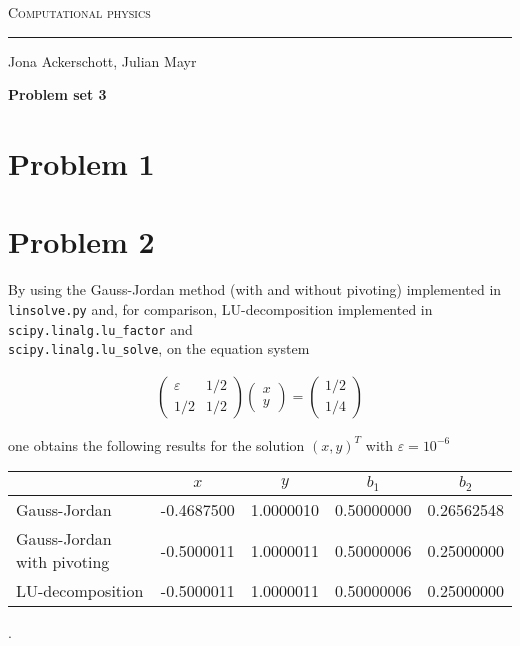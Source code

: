 \documentclass[12pt, a4paper]{article}
\begin{document}
  
  \centerline{\Huge\scshape Computational physics}
  \vspace*{0.5cm}
  \hrule
  \vspace*{0.5cm}
  \centerline{Jona Ackerschott, Julian Mayr}
  \vspace*{1cm}
  \centerline{\Large\bfseries Problem set 3}
  \vspace*{0.5cm}

  \section*{Problem 1}

  \section*{Problem 2}
  By using the Gauss-Jordan method (with and without pivoting) implemented in {\tt linsolve.py} and, for comparison, LU-decomposition implemented in {\tt scipy.linalg.lu\_factor} and\\ {\tt scipy.linalg.lu\_solve}, on the equation system

  \begin{align}
    \begin{pmatrix} \varepsilon & 1/2 \\ 1/2 & 1/2 \end{pmatrix}
    \begin{pmatrix} x \\ y \end{pmatrix} = 
    \begin{pmatrix} 1/2 \\ 1/4 \end{pmatrix}
    \label{p1_eqsys}
  \end{align}

  \noindent
  one obtains the following results for the solution $(x, y)^T$ with $\varepsilon = 10^{-6}$

  \begin{center}
    \begin{tabular}{l | c | c | c | c}
                                 & $x$        & $y$       & $b_1$       & $b_2$      \\
      \hline
      Gauss-Jordan               & -0.4687500 & 1.0000010 & 0.50000000  & 0.26562548 \\
      \hline
      Gauss-Jordan with pivoting & -0.5000011 & 1.0000011 & 0.50000006  & 0.25000000 \\
      \hline
      LU-decomposition           & -0.5000011 & 1.0000011 & 0.50000006  & 0.25000000
    \end{tabular}
  .
  \end{center}
\end{document}
